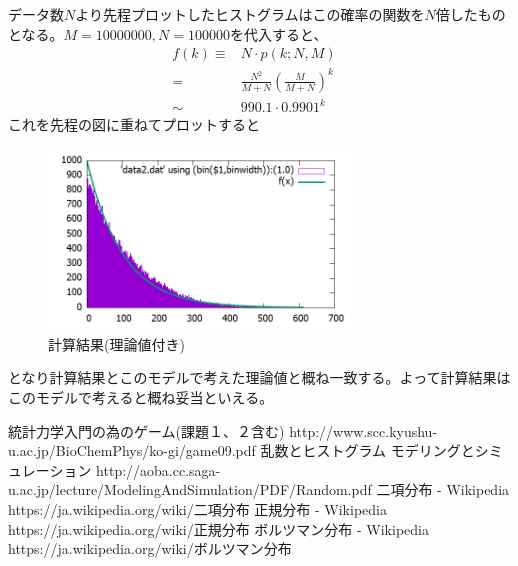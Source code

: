\documentclass[ %
  platex,%
  papersize,%
  twocolumn,
  landscape
]{jsarticle}
\begin{document}
データ数$N$より先程プロットしたヒストグラムはこの確率の関数を$N$倍したものとなる。$M=10000000, N=100000$を代入すると、
\begin{align}
  f(k)\equiv&N\cdot p(k;N,M)&\\
  =&\frac{N^2}{M+N}\left(\frac{M}{M+N}\right)^{k}&\\
  \sim&990.1\cdot0.9901^{k}&
\end{align}
これを先程の図に重ねてプロットすると
\begin{figure}[H]
\begin{center}
\includegraphics[width=8cm]{../cpp/out/dice_game/data2_with_theory.png}
\end{center}
\caption{計算結果(理論値付き)}
\end{figure}
となり計算結果とこのモデルで考えた理論値と概ね一致する。よって計算結果はこのモデルで考えると概ね妥当といえる。

\begin{thebibliography}{99}
統計力学入門の為のゲーム(課題１、２含む)
http://www.scc.kyushu-u.ac.jp/BioChemPhys/ko-gi/game09.pdf
乱数とヒストグラム モデリングとシミュレーション
http://aoba.cc.saga-u.ac.jp/lecture/ModelingAndSimulation/PDF/Random.pdf
二項分布 - Wikipedia
https://ja.wikipedia.org/wiki/二項分布
正規分布 - Wikipedia
https://ja.wikipedia.org/wiki/正規分布
ボルツマン分布 - Wikipedia
https://ja.wikipedia.org/wiki/ボルツマン分布
\end{thebibliography}
\end{document}
